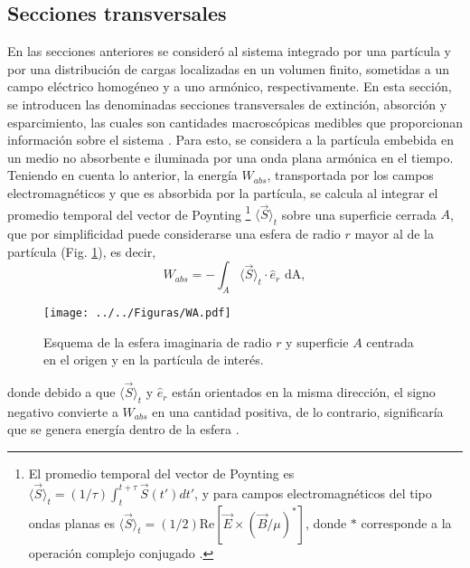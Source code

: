 \hypertarget{Cext}{\subsection{Secciones transversales}}

En las secciones anteriores se consideró al sistema integrado por una partícula y por una distribución de cargas localizadas en un volumen finito, sometidas a un campo eléctrico homogéneo y a uno armónico, respectivamente. En esta sección, se introducen las denominadas secciones transversales de extinción, absorción y esparcimiento, las cuales son cantidades macroscópicas medibles que proporcionan información sobre el sistema \cite{Bohren}. Para esto, se considera a la partícula embebida en un medio no absorbente e iluminada por una onda plana armónica en el tiempo. Teniendo en cuenta lo anterior, la energía $W_{abs}$, transportada por los campos electromagnéticos y que es absorbida por la partícula, se calcula al integrar el promedio temporal del vector de Poynting \footnote{El promedio temporal del vector de Poynting es $\langle\Vec{S}\rangle_t = (1/\tau)\int_t^{t+\tau}\Vec{S}(t')dt'$, y para campos electromagnéticos del tipo ondas planas es $\langle\Vec{S}\rangle_t = (1/2) \text{Re}[\Vec{E} \times (\Vec{B}/\mu)^{*}]$, donde $*$ corresponde a la operación complejo conjugado \cite{Bohren}. } $\langle\Vec{S}\rangle_t$  sobre una superficie cerrada $A$, que por simplificidad puede considerarse una esfera de radio $r$ mayor al de la partícula (Fig. \ref{WA}), es decir, 
\begin{equation*}
	W_{abs}=-\int_A \langle\Vec{S}\rangle_t\cdot\hat{e}_r \text{ dA},
	\label{flujopoynting}
\end{equation*}
\begin{figure}[h!]
	\centering
	\texttt{[image: ../../Figuras/WA.pdf]}
	\caption{Esquema de la esfera imaginaria  de radio $r$ y superficie $A$ centrada en el origen y en la partícula de interés.}
	\label{WA}
\end{figure}
donde debido a que $\langle\Vec{S}\rangle_t$ y $\hat{e}_r$ están orientados en la misma dirección, el signo negativo convierte a $W_{abs}$ en una cantidad positiva, de lo contrario, significaría que se genera energía dentro de la esfera \cite{Bohren}. \\


